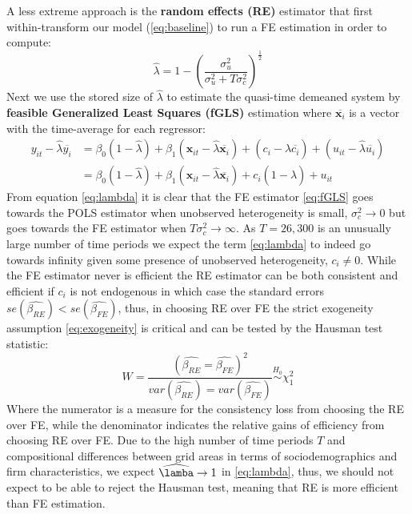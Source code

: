 \bigskip\par
A less extreme approach is the \textbf{random effects (RE)} estimator that first within-transform our model (\ref{eq:baseline}) to run a FE estimation in order to compute:
\begin{equation}
  \widehat{\lambda}=1-\left(\frac{\sigma^2_u}{\sigma^2_u+T\sigma^2_c}\right)^\frac{1}{2}
  \label{eq:lambda}
\end{equation}
Next we use the stored size of $\widehat{\lambda}$ to estimate the quasi-time demeaned system by \textbf{feasible Generalized Least Squares (fGLS)} estimation where $\overline{\bm{x}_i}$ is a vector with the time-average for each regressor:
\begin{equation}
    \begin{split}
        y_{it}-\widehat{\lambda}\overline{y_i}&=\beta_0\left(1-\widehat{\lambda}\right)+\beta_1\left(\bm{x}_{it}-\widehat{\lambda}\overline{\bm{x}_i}\right)+\left(c_i-\widehat{\lambda}\overline{c_i}\right)+\left(u_{it}-\widehat{\lambda}\overline{u_i}\right) \\
        &=\beta_0\left(1-\widehat{\lambda}\right)+\beta_1\left(\bm{x}_{it}-\widehat{\lambda}\overline{\bm{x}_i}\right)+c_i\left(1-\widehat{\lambda}\right)+u_{it}
    \end{split}
    \label{eq:fGLS}
\end{equation}
From equation \eqref{eq:lambda} it is clear that the FE estimator \eqref{eq:fGLS} goes towards the POLS estimator when unobserved heterogeneity is small, $\sigma_c^2\rightarrow0$ but goes towards the FE estimator when $T\sigma_c^2\rightarrow\infty$. As $T=26,300$ is an unusually large number of time periods we expect the term \eqref{eq:lambda} to indeed go towards infinity given some presence of unobserved heterogeneity, $c_i\neq0$. While the FE estimator never is efficient the RE estimator can be both consistent and efficient if $c_i$ is not endogenous in which case the standard errors $se\left(\widehat{\beta_{RE}}\right)<se\left(\widehat{\beta_{FE}}\right)$, thus, in choosing RE over FE the strict exogeneity assumption \eqref{eq:exogeneity} is critical and can be tested by the Hausman test statistic:
\begin{equation}
  W=\frac{\left(\widehat{\beta_{RE}}=\widehat{\beta_{FE}}\right)^2}
         {var(\widehat{\beta_{RE}})=var(\widehat{\beta_{FE}})}
         \stackrel{H_0}{\sim} \chi^2_1
  \label{eq:hausman}
\end{equation}
Where the numerator is a measure for the consistency loss from choosing the RE over FE, while the denominator indicates the relative gains of efficiency from choosing RE over FE. Due to the high number of time periods $T$ and compositional differences between grid areas in terms of sociodemographics and firm characteristics, we expect $\widehat{\lamba}\rightarrow1$ in \eqref{eq:lambda}, thus, we should not expect to be able to reject the Hausman test, meaning that RE is more efficient than FE estimation.
